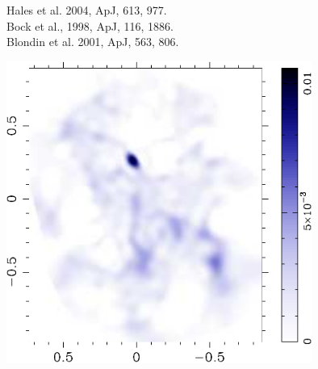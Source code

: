 

\begin{minipage}[t]{10cm}
\vspace{-15cm}
{\small Hales et al. 2004, ApJ, 613, 977. \\
Bock et al., 1998, ApJ, 116, 1886.\\
Blondin et al. 2001, ApJ, 563, 806. }
  \begin{center}
    \includegraphics[width=10cm,height=!]{./E/vela_CBI.pdf}
    \end{center}
\end{minipage}
